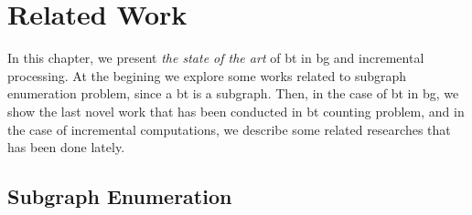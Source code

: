 \chapter{Related Work}\label{relate-work}
In this chapter, we present \emph{the state of the art} of \acrlong{bt} in \acrlong{bg} and incremental processing.
At the begining we explore some works related to subgraph enumeration problem, since a \acrshort{bt} is a subgraph. Then, in the case of \acrshort{bt} in \acrshort{bg}, we show the last novel work that has been conducted in \acrshort{bt} counting problem,
and in the case of incremental computations, we describe some related researches that has been done lately. 

\section{Subgraph Enumeration}\label{sec:rel-work:subgraph}
